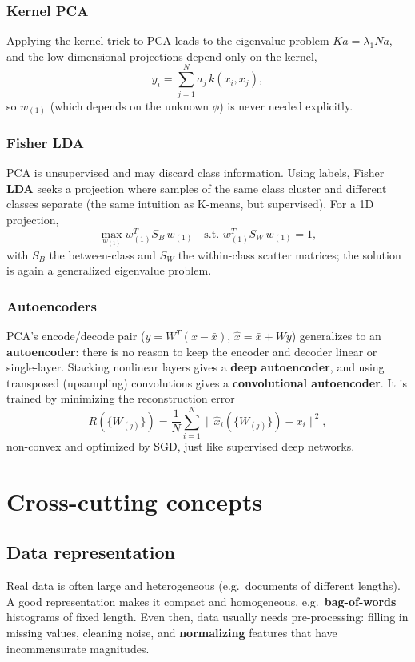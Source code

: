 \subsubsection{Kernel PCA}
Applying the kernel trick to PCA leads to the eigenvalue problem
$K a = \lambda_1 N a$, and the low-dimensional projections depend only on the
kernel,
\[
  y_i = \sum_{j=1}^{N} a_j\, k(x_i, x_j) ,
\]
so $w_{(1)}$ (which depends on the unknown $\phi$) is never needed explicitly.

\subsubsection{Fisher LDA}
PCA is unsupervised and may discard class information. Using labels, Fisher
\textbf{LDA} seeks a projection where samples of the same class cluster and
different classes separate (the same intuition as K-means, but supervised). For
a 1D projection,
\[
  \max_{w_{(1)}} w_{(1)}^T S_B\, w_{(1)} \quad \text{s.t. } w_{(1)}^T S_W\, w_{(1)} = 1 ,
\]
with $S_B$ the between-class and $S_W$ the within-class scatter matrices; the
solution is again a generalized eigenvalue problem.

\subsubsection{Autoencoders}
PCA's encode/decode pair ($y = W^T(x - \bar{x})$, $\hat{x} = \bar{x} + W y$)
generalizes to an \textbf{autoencoder}: there is no reason to keep the encoder
and decoder linear or single-layer. Stacking nonlinear layers gives a
\textbf{deep autoencoder}, and using transposed (upsampling) convolutions gives a
\textbf{convolutional autoencoder}. It is trained by minimizing the
reconstruction error
\[
  R(\{W_{(j)}\}) = \frac{1}{N} \sum_{i=1}^{N} \|\hat{x}_i(\{W_{(j)}\}) - x_i\|^2 ,
\]
non-convex and optimized by SGD, just like supervised deep networks.

\section{Cross-cutting concepts}
\subsection{Data representation}
Real data is often large and heterogeneous (e.g.\ documents of different
lengths). A good representation makes it compact and homogeneous, e.g.\
\textbf{bag-of-words} histograms of fixed length. Even then, data usually needs
pre-processing: filling in missing values, cleaning noise, and \textbf{normalizing}
features that have incommensurate magnitudes.

